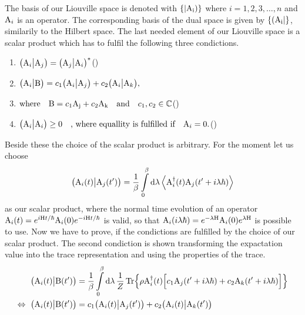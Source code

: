 The basis of our Liouville space is denoted with $\{|\mathrm{\mathrm{A}_{i}})\}$ where $i = 1,2,3,\dots,n$ and $\mathrm{A}_{i}$ is an operator.
The corresponding basis of the dual space is given by $\{(\mathrm{\mathrm{A}_{i}}|\}$, similarily to the Hilbert space.
The last needed element of our Liouville space is a scalar product which has to fulfil the following three condictions.
%
\begin{enumerate}
	\item $\begin{aligned} \big({\mathrm{A}_{i}}\big|{\mathrm{A}_{j}}\big) = \big({\mathrm{A}_{j}}\big|{\mathrm{A}_{i}}\big)^{*} \end{aligned}$\hfill {}(\theequation)
	\item $\begin{aligned} \big({\mathrm{A}_{i}}\big|{\mathrm{B}}\big) = c_{1} \big({\mathrm{A}_{i}}\big|{\mathrm{A}_{j}}\big) + c_{2} \big({\mathrm{A}_{i}}\big|{\mathrm{A}_{k}}\big), \end{aligned}$
	\item[] $\begin{aligned} \text{where\ \ \ } \mt{B} = c_{1} \mt{A_{j}} + c_{2} \mt{A_{k}} \qq{and} c_{1}, c_{2} \in \mathbb{C} \end{aligned}$\hfill {}(\theequation)
	\item $\begin{aligned} \obraket{\mt{A}_{i}}{\mt{A}_{i}}\geq 0 \qq{, where equallity is fulfilled if} \mt{A}_{i} = 0. \end{aligned}$\hfill {}(\theequation)
\end{enumerate}
%
Beside these the choice of the scalar product is arbitrary.
For the moment let us choose 
%
\begin{align}
	\big({\mathrm{A}_{i}(t)}\big|{\mathrm{A}_{j}(t')}\big) = \frac{1}{\beta} \int\limits_{0}^{\beta} \dd{\lambda} \expval{\mathrm{A}_{i}^{\dag}(t) \mathrm{A}_{j}(t'+i\lambda\hbar)}
	\label{eq:scalar product Liouville space2.0}
\end{align}
%
as our scalar product, where the normal time evolution of an operator \linebreak $\mathrm{A}_{i}(t) = e^{i\mathrm{H}t/\hbar} \mathrm{A}_{i}(0) e^{-i\mathrm{H}t/\hbar}$ is valid, so that $\mathrm{A}_{i}(i\lambda\hbar) = e^{-\lambda\mathrm{H}} \mathrm{A}_{i}(0) e^{\lambda\mathrm{H}}$ is possible to use.
Now we have to prove, if the condictions are fulfilled by the choice of our scalar product.
The second condiction is shown transforming the expactation value into the trace representation and using the properties of the trace.
%
\begin{align}
	\big({\mathrm{A}_{i}(t)}\big|{\mathrm{B}(t')}\big) &= \frac{1}{\beta} \int\limits_{0}^{\beta} \dd{\lambda} \frac{1}{Z} \Tr{\rho \mathrm{A}_{i}^{\dag}(t) \Big[c_{1} \mathrm{A}_{j}(t'+i\lambda\hbar) + c_{2} \mathrm{A}_{k}(t'+i\lambda\hbar)\Big]}
	\notag \\
	\Leftrightarrow\ \big({\mathrm{A}_{i}(t)}\big|{\mathrm{B}(t')}\big) &= c_{1} \big({\mathrm{A}_{i}(t)}\big|{\mathrm{A}_{j}(t')}\big) + c_{2} \big({\mathrm{A}_{i}(t)}\big|{\mathrm{A}_{k}(t')}\big)
\end{align}
